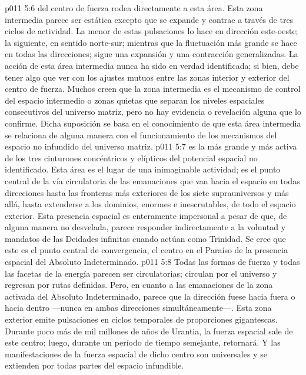 \vs p011 5:6 \pc {} del centro de fuerza rodea directamente a esta área. Esta zona intermedia parece ser estática excepto que se expande y contrae a través de tres ciclos de actividad. La menor de estas pulsaciones lo hace en dirección este\hyp{}oeste; la siguiente, en sentido norte\hyp{}sur; mientras que la fluctuación más grande se hace en todas las direcciones; sigue una expansión y una contracción generalizadas. La acción de esta área intermedia nunca ha sido en verdad identificada; si bien, debe tener algo que ver con los ajustes mutuos entre las zonas interior y exterior del centro de fuerza. Muchos creen que la zona intermedia es el mecanismo de control del espacio intermedio o zonas quietas que separan los niveles espaciales consecutivos del universo matriz, pero no hay evidencia o revelación alguna que lo confirme. Dicha suposición se basa en el conocimiento de que esta área intermedia se relaciona de alguna manera con el funcionamiento de los mecanismos del espacio no infundido del universo matriz.
\vs p011 5:7 \pc {} es la más grande y más activa de los tres cinturones concéntricos y elípticos del potencial espacial no identificado. Esta área es el lugar de una inimaginable actividad; es el punto central de la vía circulatoria de las emanaciones que van hacia el espacio en todas direcciones hasta las fronteras más exteriores de los siete suprauniversos y más allá, hasta extenderse a los dominios, enormes e inescrutables, de todo el espacio exterior. Esta presencia espacial es enteramente impersonal a pesar de que, de alguna manera no desvelada, parece responder indirectamente a la voluntad y mandatos de las Deidades infinitas cuando actúan como Trinidad. Se cree que este es el punto central de convergencia, el centro en el Paraíso de la presencia espacial del Absoluto Indeterminado.
\vs p011 5:8 Todas las formas de fuerza y todas las facetas de la energía parecen ser circulatorias; circulan por el universo y regresan por rutas definidas. Pero, en cuanto a las emanaciones de la zona activada del Absoluto Indeterminado, parece que la dirección fuese hacia fuera o hacia dentro ---nunca en ambas direcciones simultáneamente---. Esta zona exterior emite pulsaciones en ciclos temporales de proporciones gigantescas. Durante poco más de mil millones de años de Urantia, la fuerza espacial sale de este centro; luego, durante un período de tiempo semejante, retornará. Y las manifestaciones de la fuerza espacial de dicho centro son universales y se extienden por todas partes del espacio infundible.

